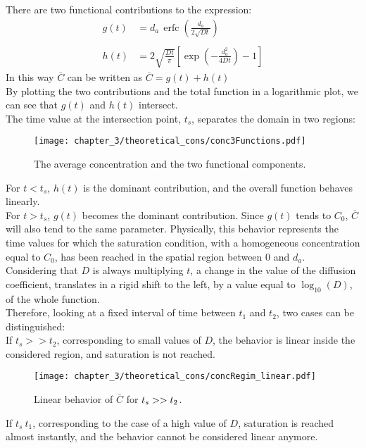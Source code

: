 There are two functional contributions to the expression:
\begin{align}
    g(t) &= d_{a\ }\operatorname{erfc}\left(\frac{d_a}{2\sqrt{Dt}}\right) \label{eq:g_t} \\
    \\[1pt]
    h(t) &= 2\sqrt{\frac{Dt}{\pi}}\left[\exp{\left(-\frac{d_a^2}{4Dt}\right)}-1\right] \label{eq:h_t}
\end{align}
In this way $\overline{C}$ can be written as $\overline{C} = g(t) + h(t)$
\\
By plotting the two contributions and the total function in a logarithmic plot, we can see that $g(t)$ and $h(t)$ intersect.
\\
The time value at the intersection point, $t_s$, separates the domain in two regions:
\begin{figure}[H]
   \centering
   \texttt{[image: chapter\_3/theoretical\_cons/conc3Functions.pdf]} 
   \caption{The average concentration and the two functional components. }
   \label{fig:c_bar_plot}
\end{figure}
For $t<t_s$, $h(t)$ is the dominant contribution, and the overall function behaves linearly.
\\
For $t>t_s$, $g(t)$ becomes the dominant contribution. Since $g(t)$ tends to $C_0$, $\overline{C}$ will also tend to the same parameter. Physically, this behavior represents the time values for which the saturation condition, with a homogeneous concentration equal to $C_0$, has been reached in the spatial region between 0 and $d_a$. 
\\
Considering that $D$ is always multiplying $t$, a change in the value of the diffusion coefficient, translates in a rigid shift to the left, by a value equal to $\log_{10}(D)$, of the whole function.
\\
Therefore, looking at a fixed interval of time between $t_1$ and $t_2$, two cases can be distinguished:
\\
If $t_s >> t_2$, corresponding to small values of $D$, the behavior is linear inside the considered region, and saturation is not reached.
\begin{figure}[H]
   \centering
   \texttt{[image: chapter\_3/theoretical\_cons/concRegim\_linear.pdf]} 
    \vspace*{-30pt}
   \caption{Linear behavior of $\bar{C}$ for $\protect t_s >> t_2$.}
   \label{fig:c_bar_linear}
\end{figure}
If $t_s ~ t_1$, corresponding to the case of a high value of $D$, saturation is reached almost instantly, and the behavior cannot be considered linear anymore.
